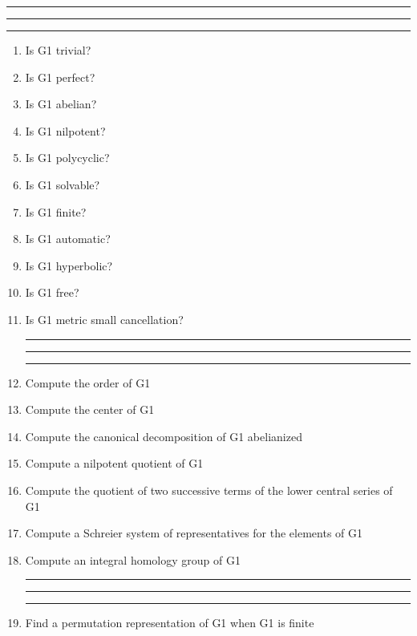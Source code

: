 
\bigskip
\hrule\hrule\hrule

\begin{enumerate}

\item Is G1 trivial?

\item Is G1 perfect?

\item Is G1 abelian?

\item Is G1 nilpotent?

\item Is G1 polycyclic?

\item Is G1 solvable?

\item Is G1 finite?

\item Is G1 automatic?

\item Is G1 hyperbolic?

\item Is G1 free?

\item Is G1 metric small cancellation?

\bigskip
\hrule\hrule\hrule

\item Compute the order of G1

\item Compute the center of G1

\item Compute the canonical decomposition of G1 abelianized

\item Compute a nilpotent quotient of G1

\item Compute the quotient of two successive terms of the lower central
series of G1

\item Compute a Schreier system of representatives for the elements of G1

\item Compute an integral homology group of G1

\bigskip
\hrule\hrule\hrule

\item Find a permutation representation of G1 when G1 is finite


\end{enumerate}
